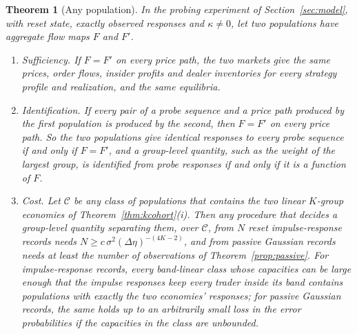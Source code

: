 \documentclass[12pt]{article}
\newtheorem{theorem}{Theorem}[section]
\theoremstyle{definition}
\theoremstyle{remark}
\begin{document}
\begin{theorem}[Any population]\label{thm:anypop}
In the probing experiment of Section~\ref{sec:model}, with reset state, exactly observed responses and $\kappa\ne0$, let two populations have aggregate flow maps $F$ and $F'$.
\begin{enumerate}[label=(\roman*),itemsep=1pt]
\item \emph{Sufficiency.} If $F=F'$ on every price path, the two markets give the same prices, order flows, insider profits and dealer inventories for every strategy profile and realization, and the same equilibria.
\item \emph{Identification.} If every pair of a probe sequence and a price path produced by the first population is produced by the second, then $F=F'$ on every price path. So the two populations give identical responses to every probe sequence if and only if $F=F'$, and a group-level quantity, such as the weight of the largest group, is identified from probe responses if and only if it is a function of $F$.
\item \emph{Cost.} Let $\mathcal C$ be any class of populations that contains the two linear $K$-group economies of Theorem~\ref{thm:kcohort}(i). Then any procedure that decides a group-level quantity separating them, over $\mathcal C$, from $N$ reset impulse-response records needs $N\ge c\,\sigma^2(\Delta\eta)^{-(4K-2)}$, and from passive Gaussian records needs at least the number of observations of Theorem~\ref{prop:passive}. For impulse-response records, every band-linear class whose capacities can be large enough that the impulse responses keep every trader inside its band contains populations with exactly the two economies' responses; for passive Gaussian records, the same holds up to an arbitrarily small loss in the error probabilities if the capacities in the class are unbounded.
\end{enumerate}
\end{theorem}
\end{document}
